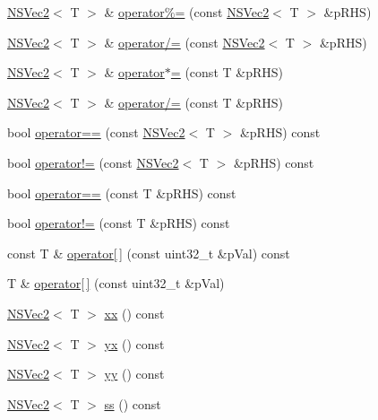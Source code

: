 \begin{DoxyCompactItemize}
\item 
\hyperlink{structNSVec2}{N\-S\-Vec2}$<$ T $>$ \& \hyperlink{structNSVec2_a5ee8590233b6aecbc7e8a580111e473b}{operator\%=} (const \hyperlink{structNSVec2}{N\-S\-Vec2}$<$ T $>$ \&p\-R\-H\-S)
\item 
\hyperlink{structNSVec2}{N\-S\-Vec2}$<$ T $>$ \& \hyperlink{structNSVec2_a1dbfa1a54bf1dd2016b88a0bb695adeb}{operator/=} (const \hyperlink{structNSVec2}{N\-S\-Vec2}$<$ T $>$ \&p\-R\-H\-S)
\item 
\hyperlink{structNSVec2}{N\-S\-Vec2}$<$ T $>$ \& \hyperlink{structNSVec2_a7a8ce8b0b89a1bd6fd21dcea7d619612}{operator$\ast$=} (const T \&p\-R\-H\-S)
\item 
\hyperlink{structNSVec2}{N\-S\-Vec2}$<$ T $>$ \& \hyperlink{structNSVec2_af5536444e50c402496684797d9811b27}{operator/=} (const T \&p\-R\-H\-S)
\item 
bool \hyperlink{structNSVec2_aec4324141ec29405ff1d469fb2da4794}{operator==} (const \hyperlink{structNSVec2}{N\-S\-Vec2}$<$ T $>$ \&p\-R\-H\-S) const 
\item 
bool \hyperlink{structNSVec2_acfcdae727a2d93a158d147a1443573d6}{operator!=} (const \hyperlink{structNSVec2}{N\-S\-Vec2}$<$ T $>$ \&p\-R\-H\-S) const 
\item 
bool \hyperlink{structNSVec2_a18086834e0c531b054ad969895a2c693}{operator==} (const T \&p\-R\-H\-S) const 
\item 
bool \hyperlink{structNSVec2_a732834a39d145a0673cda7839e4073ce}{operator!=} (const T \&p\-R\-H\-S) const 
\item 
const T \& \hyperlink{structNSVec2_a96b6db61b071cab6300ece3e6e0e9bee}{operator\mbox{[}$\,$\mbox{]}} (const uint32\-\_\-t \&p\-Val) const 
\item 
T \& \hyperlink{structNSVec2_a549510962888472f667c0da14f06990f}{operator\mbox{[}$\,$\mbox{]}} (const uint32\-\_\-t \&p\-Val)
\item 
\hyperlink{structNSVec2}{N\-S\-Vec2}$<$ T $>$ \hyperlink{structNSVec2_a870ad0c9318fb00704a10da5a497f4b3}{xx} () const 
\item 
\hyperlink{structNSVec2}{N\-S\-Vec2}$<$ T $>$ \hyperlink{structNSVec2_a73f7317bc10aa5c99f029500e476f0b7}{yx} () const 
\item 
\hyperlink{structNSVec2}{N\-S\-Vec2}$<$ T $>$ \hyperlink{structNSVec2_ad9060458e9089385dc06dd89ada0557d}{yy} () const 
\item 
\hyperlink{structNSVec2}{N\-S\-Vec2}$<$ T $>$ \hyperlink{structNSVec2_ae7d6947fb5d8cb5beea611f3ab37e915}{ss} () const 
\item 

\end{DoxyCompactItemize}
